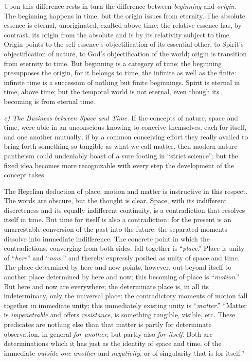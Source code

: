 \documentclass[12pt,a4paper]{book}
\newcommand{\runin}[1]{\emph{#1}\hspace{0.4em}}
\begin{document}
Upon this difference rests in turn the difference between \emph{beginning} and
\emph{origin}. The beginning happens in time, but the origin issues from eternity.
The absolute essence is eternal, unoriginated, exalted above time; the relative
essence has, by contrast, its origin from the absolute and is by its relativity
subject to time. Origin points to the self-essence's objectification of its
essential other, to Spirit's objectification of nature, to God's objectification of
the world; origin is transition from eternity to time. But beginning is a category
of time; the beginning presupposes the origin, for it belongs to time, the infinite
as well as the finite: infinite time is a succession of nothing but finite
beginnings. Spirit is eternal in time, above time; but the temporal world is not
eternal, even though its becoming is from eternal time.

\runin{c) The Business between Space and Time.} If the concepts of nature, space
and time, were able in an unconscious knowing to conceive themselves, each for
itself, and one another mutually; if by a common conceiving effort they really
availed to bring forth something so tangible as what we call matter, then modern
nature-pantheism could undeniably boast of a sure footing in ``strict science'';
but the fixed idea becomes more recognizable with every step the development of
the concept takes.

The Hegelian deduction of place, motion and matter is instructive in this respect.
The words are obscure, but the thought is clear. Space, with its indifferent
discreteness and its equally indifferent continuity, is a contradiction that
resolves itself in time. But time for itself is also a contradiction; for the
present is an unarrestable conversion of the past into the future: the separated
moments dissolve into immediate indifference. The concrete point in which the
contradictions, converging from both sides, fall together is ``\emph{place}.''
Place is unity of ``\emph{here}'' and ``\emph{now},'' and thereby expressly posited
as unity of space and time. The place determined by here and now points, however,
out beyond itself to another place determined by here and now; this becoming of
place is ``\emph{motion}.'' But here and now are everywhere; the determinate place
is, in all its indeterminacy, only the universal place: the contradictory moments
of motion fall together in immediate unity; this immediately existing unity is
``\emph{matter}.'' ``Matter is \emph{impenetrable} and offers \emph{resistance},
is something tangible, visible, etc. These predicates are nothing else than that
matter is partly for determinate observation, in general \emph{for another}, but
partly also \emph{for itself}. Both are determinations which it has just as the
identity of space and time, of the immediate \emph{outside-one-another} and
\emph{negativity}, or of singularity that is for itself.''
\end{document}
